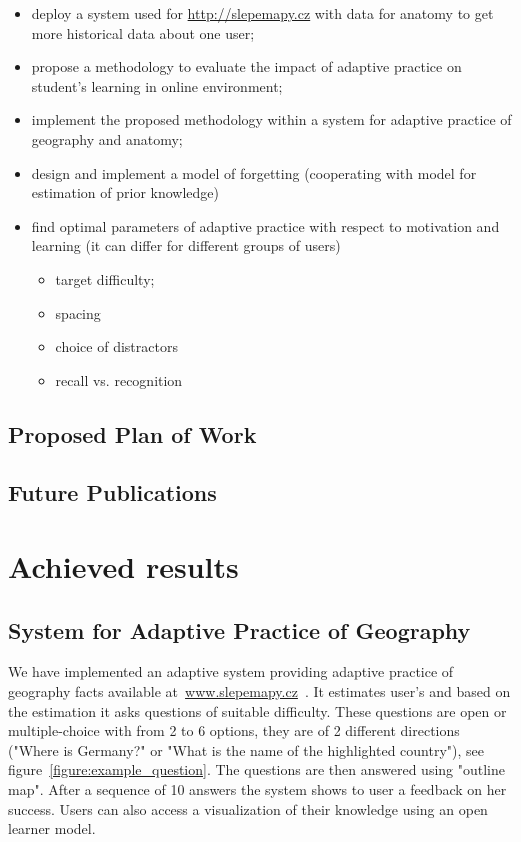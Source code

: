 \documentclass[table,color]{fithesis3/fithesis3}
\begin{document}
\begin{itemize}
	\item deploy a system used for \url{http://slepemapy.cz} with data for
		anatomy to get more historical data about one user;
	\item propose a methodology to evaluate the impact of adaptive practice on
		student's learning in online environment;
	\item implement the proposed methodology within a system for adaptive
		practice of geography and anatomy;
	\item design and implement a model of forgetting (cooperating with model for
		estimation of prior knowledge)
	\item find optimal parameters of adaptive practice with respect to motivation
		and learning (it can differ for different groups of users)
		\begin{itemize}
			\item target difficulty;
			\item spacing
			\item choice of distractors
			\item recall vs. recognition
		\end{itemize}
\end{itemize}

\section{Proposed Plan of Work}

\section{Future Publications}

\chapter{Achieved results}

\section{System for Adaptive Practice of Geography}

We have implemented an adaptive system providing adaptive practice of geography
facts available at~\url{www.slepemapy.cz}~\cite{papousek2014adaptive}. It
estimates user's and based on the estimation it asks questions of suitable
difficulty. These questions are open or multiple-choice with from 2 to 6
options, they are of 2 different directions ("Where is Germany?" or "What is
the name of the highlighted country"), see
figure~\ref{figure:example_question}. The questions are then answered using
"outline map". After a sequence of 10 answers the system shows to user a
feedback on her success.  Users can also access a visualization of their
knowledge using an open learner model.
\end{document}
